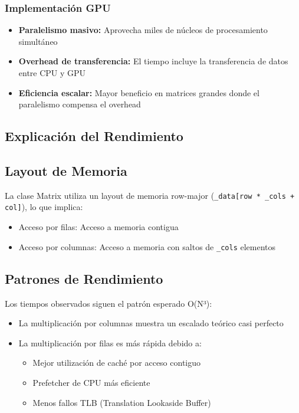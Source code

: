 \documentclass[11pt]{article}
\begin{document}
\subsubsection{Implementación GPU}
\begin{itemize}
    \item \textbf{Paralelismo masivo:} Aprovecha miles de núcleos de procesamiento simultáneo
    \item \textbf{Overhead de transferencia:} El tiempo incluye la transferencia de datos entre CPU y GPU
    \item \textbf{Eficiencia escalar:} Mayor beneficio en matrices grandes donde el paralelismo compensa el overhead
\end{itemize}

\subsection{Explicación del Rendimiento}

\subsection{Layout de Memoria}
La clase Matrix utiliza un layout de memoria row-major (\texttt{\_data[row * \_cols + col]}), lo que implica:
\begin{itemize}
    \item Acceso por filas: Acceso a memoria contigua
    \item Acceso por columnas: Acceso a memoria con saltos de \texttt{\_cols} elementos
\end{itemize}

\subsection{Patrones de Rendimiento}
Los tiempos observados siguen el patrón esperado O(N³):
\begin{itemize}
    \item La multiplicación por columnas muestra un escalado teórico casi perfecto
    \item La multiplicación por filas es más rápida debido a:
    \begin{itemize}
        \item Mejor utilización de caché por acceso contiguo
        \item Prefetcher de CPU más eficiente
        \item Menos fallos TLB (Translation Lookaside Buffer)
    \end{itemize}
\end{itemize}
\end{document}
